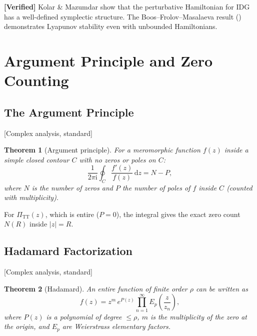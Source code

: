 \documentclass[11pt,a4paper]{article}
\theoremstyle{plain}
\newtheorem{theorem}{Theorem}[section]
\theoremstyle{definition}
\theoremstyle{remark}
\newcommand{\dd}{\mathrm{d}}
\newcommand{\ii}{\mathrm{i}}
\newcommand{\PiTT}{\Pi_{\mathrm{TT}}}
\newcommand{\fromlit}[1]{\textcolor{blue!70!black}{\textsf{[#1]}}}
\newcommand{\verified}[1]{%
  \par\smallskip\noindent
  \colorbox{green!10}{\parbox{\dimexpr\linewidth-2\fboxsep}{%
    \textcolor{green!50!black}{\textbf{[Verified]}} #1}}%
  \par\smallskip}
\begin{document}
\verified{Kolar \& Mazumdar show that the perturbative Hamiltonian for
IDG has a well-defined symplectic structure.  The Boos--Frolov--Masalaeva
result (\cite{BoosFrolov2024}) demonstrates Lyapunov stability even with
unbounded Hamiltonians.}


\section{Argument Principle and Zero Counting}
\label{sec:argument}

\subsection{The Argument Principle}

\fromlit{Complex analysis, standard}

\begin{theorem}[Argument principle]
\label{thm:arg-principle}
For a meromorphic function $f(z)$ inside a simple closed contour $C$
with no zeros or poles on $C$:
\begin{equation}\label{eq:arg-principle}
  \frac{1}{2\pi\ii}\oint_C \frac{f'(z)}{f(z)}\,\dd z = N - P,
\end{equation}
where $N$ is the number of zeros and $P$ the number of poles of $f$
inside $C$ (counted with multiplicity).
\end{theorem}

For $\PiTT(z)$, which is entire ($P = 0$), the integral gives the
exact zero count $N(R)$ inside $|z| = R$.

\subsection{Hadamard Factorization}

\fromlit{Complex analysis, standard}

\begin{theorem}[Hadamard]
\label{thm:hadamard}
An entire function of finite order $\rho$ can be written as
\begin{equation}\label{eq:hadamard}
  f(z) = z^m\,e^{P(z)}\prod_{n=1}^{\infty}
  E_p\!\left(\frac{z}{z_n}\right),
\end{equation}
where $P(z)$ is a polynomial of degree $\leq \rho$, $m$ is the
multiplicity of the zero at the origin, and $E_p$ are Weierstrass
elementary factors.
\end{theorem}
\end{document}
